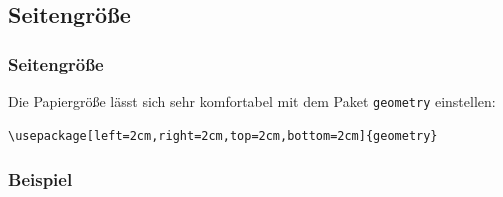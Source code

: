 \subsection{Seitengröße}
\begin{frame}[fragile,t]
\frametitle{Seitengröße}
Die Papiergröße lässt sich sehr komfortabel mit dem Paket {\tt geometry} einstellen:\vfill
\begin{lstlisting}[style=Latex]
\usepackage[left=2cm,right=2cm,top=2cm,bottom=2cm]{geometry}
\end{lstlisting}
\end{frame}


\begin{frame}[fragile,t]
\frametitle{Beispiel}
\vspace{-10pt}
\begin{minipage}{\textwidth}
\begin{minipage}{.49\textwidth}
\begin{figure}[htp]
\centering
{}

\end{figure}
\end{minipage}
\end{minipage}
\end{frame}
